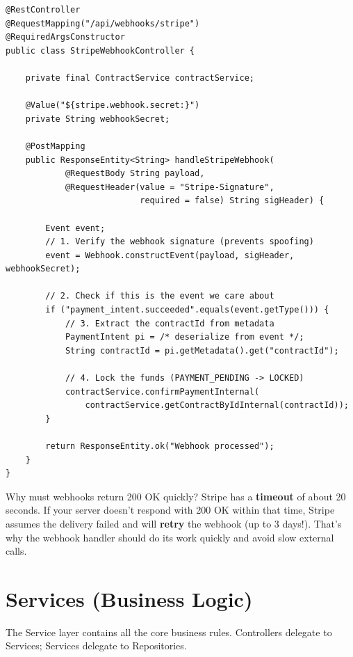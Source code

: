 \documentclass[11pt, a4paper]{article}
\begin{document}
\begin{lstlisting}[caption={StripeWebhookController.java -- Stripe Callback}]
@RestController
@RequestMapping("/api/webhooks/stripe")
@RequiredArgsConstructor
public class StripeWebhookController {

    private final ContractService contractService;

    @Value("${stripe.webhook.secret:}")
    private String webhookSecret;

    @PostMapping
    public ResponseEntity<String> handleStripeWebhook(
            @RequestBody String payload,
            @RequestHeader(value = "Stripe-Signature",
                           required = false) String sigHeader) {

        Event event;
        // 1. Verify the webhook signature (prevents spoofing)
        event = Webhook.constructEvent(payload, sigHeader, webhookSecret);

        // 2. Check if this is the event we care about
        if ("payment_intent.succeeded".equals(event.getType())) {
            // 3. Extract the contractId from metadata
            PaymentIntent pi = /* deserialize from event */;
            String contractId = pi.getMetadata().get("contractId");

            // 4. Lock the funds (PAYMENT_PENDING -> LOCKED)
            contractService.confirmPaymentInternal(
                contractService.getContractByIdInternal(contractId));
        }

        return ResponseEntity.ok("Webhook processed");
    }
}
\end{lstlisting}

\begin{interviewbox}{Why must webhooks return 200 OK quickly?}
Stripe has a \textbf{timeout} of about 20 seconds. If your server doesn't respond with 200 OK within that time, Stripe assumes the delivery failed and will \textbf{retry} the webhook (up to 3 days!). That's why the webhook handler should do its work quickly and avoid slow external calls.
\end{interviewbox}


\section{Services (Business Logic)}

The Service layer contains all the core business rules. Controllers delegate to Services; Services delegate to Repositories.
\end{document}
